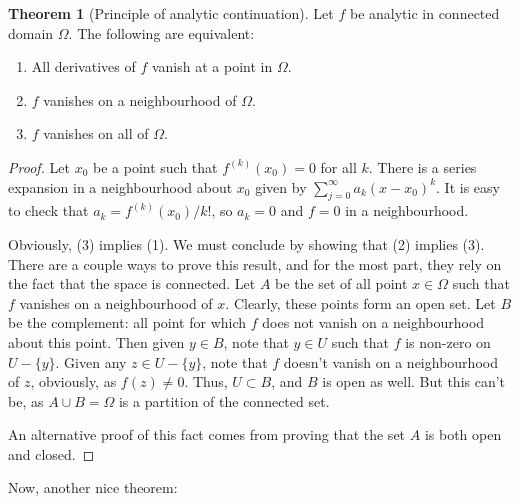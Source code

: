 \documentclass[aps,pra,showpacs,notitlepage,onecolumn,superscriptaddress,nofootinbib]{revtex4-1}
\theoremstyle{definition}
\newtheorem{theorem}{Theorem}[section]
\begin{document}
\begin{theorem}[Principle of analytic continuation]
  Let $f$ be analytic in connected domain $\Omega$. The following are equivalent:
  \begin{enumerate}
  \item All derivatives of $f$ vanish at a point in $\Omega$.
  \item $f$ vanishes on a neighbourhood of $\Omega$.
    \item $f$ vanishes on all of $\Omega$.
  \end{enumerate}
\end{theorem}
\begin{proof}
  Let $x_0$ be a point such that $f^{(k)}(x_0) = 0$ for all $k$. There is a series expansion in a neighbourhood about $x_0$ given by $\sum_{j = 0}^{\infty} a_k (x - x_0)^k$.
  It is easy to check that $a_k = f^{(k)}(x_0)/k!$, so $a_k = 0$ and $f = 0$ in a neighbourhood.

  Obviously, (3) implies (1). We must conclude by showing that (2) implies (3). There are a couple ways to prove this result, and for the most part,
  they rely on the fact that the space is connected. Let $A$ be the set of all point $x \in \Omega$ such that $f$ vanishes on a neighbourhood of $x$.
  Clearly, these points form an open set. Let $B$ be the complement: all point for which $f$ does not vanish on a neighbourhood about this point.
  Then given $y \in B$, note that $y \in U$ such that $f$ is non-zero on $U - \{y\}$. Given any $z \in U - \{y\}$, note that $f$ doesn't vanish on a neighbourhood
  of $z$, obviously, as $f(z) \neq 0$. Thus, $U \subset B$, and $B$ is open as well. But this can't be, as $A \cup B = \Omega$ is a partition of the connected set.

  An alternative proof of this fact comes from proving that the set $A$ is both open and closed.
\end{proof}

\noindent Now, another nice theorem:
\end{document}

